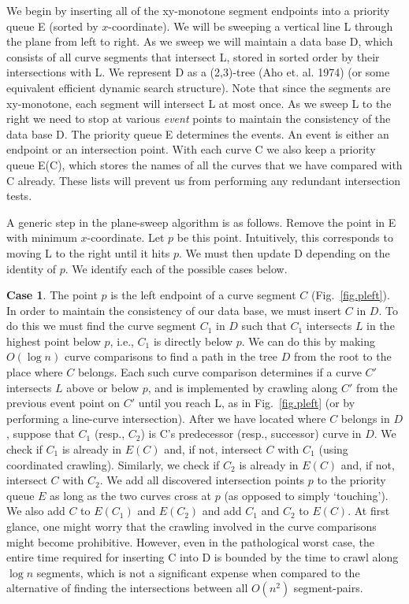 We begin by inserting all of the xy-monotone segment endpoints into a priority queue E
(sorted by $x$-coordinate).
We will be sweeping a vertical line L through the plane from left to right.
As we sweep we will maintain a data base D, which consists of all curve
segments that intersect L, stored in sorted order by their intersections with L.
We represent D as a (2,3)-tree (Aho et. al. 1974) (or some equivalent efficient dynamic
search structure).
Note that since the segments are xy-monotone, each segment will intersect L at most
once.  As we sweep L to the right we need to stop at various {\em event} points to 
maintain the consistency of the data base D.
The priority queue E determines the events.
An event is either an endpoint or an intersection point.
With each curve C we also keep a priority queue E(C), which stores the names of 
all the curves that we have compared with C already.
These lists will prevent us from performing any redundant intersection tests.

A generic step in the plane-sweep algorithm is as follows.
Remove the point in E with minimum $x$-coordinate.
Let $p$ be this point.
Intuitively, this corresponds to moving L to the right until it hits $p$.
We must then update D depending on the identity of $p$.
We identify each of the possible cases below.

{\bf Case 1}. The point $p$ is the left endpoint of a curve segment $C$ 
(Fig.~\ref{fig.pleft}).
In order to maintain the consistency of our data base, we must insert $C$ in $D$.
To do this we must find the curve segment $C_{1}$ in $D$ such that $C_{1}$
intersects $L$ in the highest point below $p$, i.e., $C_{1}$ is directly below $p$.
We can do this by making $O(\log n)$ curve comparisons to find
a path in the tree $D$ from the root to the place where $C$ belongs.
Each such curve comparison determines if a curve $C'$ intersects $L$ above or below $p$,
and is implemented by crawling along $C'$ from the previous event point on $C'$ until you 
reach L, as in Fig.~\ref{fig.pleft} (or by performing a line-curve intersection).
After we have located where $C$ belongs in $D$, suppose that $C_{1}$ (resp., $C_{2}$)
is C's predecessor (resp., successor) curve in $D$.
We check if $C_{1}$ is already in $E(C)$ and, if not, intersect $C$ with $C_{1}$
(using coordinated crawling).
Similarly, we check if $C_{2}$ is already in $E(C)$ and, if not, intersect $C$ with $C_{2}$.
We add all discovered intersection points $p$ to the priority queue $E$ as long 
as the two curves cross at $p$ (as opposed to simply `touching').
We also add $C$ to $E(C_{1})$ and $E(C_{2})$ and add $C_{1}$ and $C_{2}$ to $E(C)$.
At first glance, one might worry that the crawling involved in the curve 
	comparisons might become prohibitive.  However, even in the pathological worst case,
	the entire time required for inserting C into D is bounded by the time to
	crawl along $\log n$ segments, which is not a significant expense when compared to
	the alternative of finding the intersections between all $O(n^{2})$ segment-pairs.

